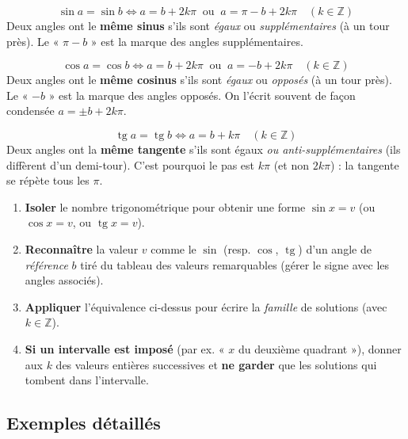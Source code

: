 \documentclass[11pt,a4paper]{article}
\DeclareMathOperator{\tg}{tg}        %
\newcommand{\Z}{\mathbb{Z}}
\begin{document}
\begin{formule}
\[
\boxed{\;\sin a=\sin b\iff a=b+2k\pi\ \text{ ou }\ a=\pi-b+2k\pi\quad(k\in\Z)\;}
\]
Deux angles ont le \textbf{même sinus} s'ils sont \emph{égaux} ou \emph{supplémentaires}
(à un tour près). Le « $\pi-b$ » est la marque des angles supplémentaires.
\end{formule}

\begin{formule}
\[
\boxed{\;\cos a=\cos b\iff a=b+2k\pi\ \text{ ou }\ a=-b+2k\pi\quad(k\in\Z)\;}
\]
Deux angles ont le \textbf{même cosinus} s'ils sont \emph{égaux} ou \emph{opposés} (à un tour près).
Le « $-b$ » est la marque des angles opposés. On l'écrit souvent de façon condensée
$a=\pm b+2k\pi$.
\end{formule}

\begin{formule}
\[
\boxed{\;\tg a=\tg b\iff a=b+k\pi\quad(k\in\Z)\;}
\]
Deux angles ont la \textbf{même tangente} s'ils sont égaux \emph{ou anti-supplémentaires} (ils
diffèrent d'un demi-tour). C'est pourquoi le pas est $k\pi$ (et non $2k\pi$) : la tangente se répète
tous les $\pi$.
\end{formule}

\begin{methode}
\begin{enumerate}[leftmargin=1.7em,topsep=2pt,itemsep=2pt]
  \item \textbf{Isoler} le nombre trigonométrique pour obtenir une forme
        $\sin x=v$ (ou $\cos x=v$, ou $\tg x=v$).
  \item \textbf{Reconnaître} la valeur $v$ comme le $\sin$ (resp. $\cos$, $\tg$) d'un angle de
        \emph{référence} $b$ tiré du tableau des valeurs remarquables (gérer le signe avec les
        angles associés).
  \item \textbf{Appliquer} l'équivalence ci-dessus pour écrire la \emph{famille} de solutions
        (avec $k\in\Z$).
  \item \textbf{Si un intervalle est imposé} (par ex. « $x$ du deuxième quadrant »), donner aux
        $k$ des valeurs entières successives et \textbf{ne garder} que les solutions qui tombent
        dans l'intervalle.
\end{enumerate}
\end{methode}

\subsection{Exemples détaillés}
\end{document}
